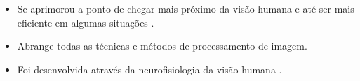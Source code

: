 \begin{itemize}

\item Se aprimorou a ponto de chegar mais próximo da visão humana e até ser mais eficiente em algumas situações .

\item Abrange todas as técnicas e métodos de processamento de imagem.

\item Foi desenvolvida através da neurofisiologia da visão humana \cite{MARR76}.

\end{itemize}